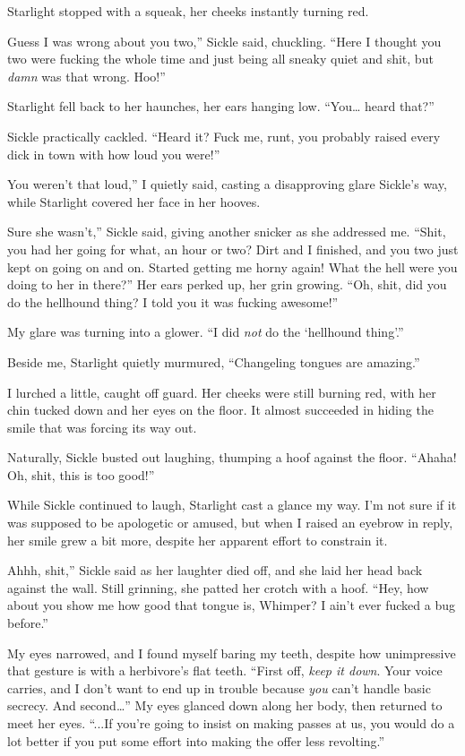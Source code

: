 Starlight stopped with a squeak, her cheeks instantly turning red.

\leavevmode{}Guess I was wrong about you two,” Sickle said, chuckling. “Here I thought you two were fucking the whole time and just being all sneaky quiet and shit, but \textit{damn} was that wrong. Hoo!”

Starlight fell back to her haunches, her ears hanging low. “You… heard that?”

Sickle practically cackled. “Heard it? Fuck me, runt, you probably raised every dick in town with how loud you were!”

\leavevmode{}You weren’t that loud,” I quietly said, casting a disapproving glare Sickle’s way, while Starlight covered her face in her hooves.

\leavevmode{}Sure she wasn’t,” Sickle said, giving another snicker as she addressed me. “Shit, you had her going for what, an hour or two? Dirt and I finished, and you two just kept on going on and on. Started getting me horny again! What the hell were you doing to her in there?” Her ears perked up, her grin growing. “Oh, shit, did you do the hellhound thing? I told you it was fucking awesome!”

My glare was turning into a glower. “I did \textit{not} do the ‘hellhound thing’.”

Beside me, Starlight quietly murmured, “Changeling tongues are amazing.”

I lurched a little, caught off guard. Her cheeks were still burning red, with her chin tucked down and her eyes on the floor. It almost succeeded in hiding the smile that was forcing its way out.

Naturally, Sickle busted out laughing, thumping a hoof against the floor. “Ahaha! Oh, shit, this is too good!”

While Sickle continued to laugh, Starlight cast a glance my way. I’m not sure if it was supposed to be apologetic or amused, but when I raised an eyebrow in reply, her smile grew a bit more, despite her apparent effort to constrain it.

\leavevmode{}Ahhh, shit,” Sickle said as her laughter died off, and she laid her head back against the wall. Still grinning, she patted her crotch with a hoof. “Hey, how about you show me how good that tongue is, Whimper? I ain’t ever fucked a bug before.”

My eyes narrowed, and I found myself baring my teeth, despite how unimpressive that gesture is with a herbivore’s flat teeth. “First off, \textit{keep it down}. Your voice carries, and I don’t want to end up in trouble because \textit{you} can’t handle basic secrecy. And second…” My eyes glanced down along her body, then returned to meet her eyes. “...If you’re going to insist on making passes at us, you would do a lot better if you put some effort into making the offer less revolting.”

